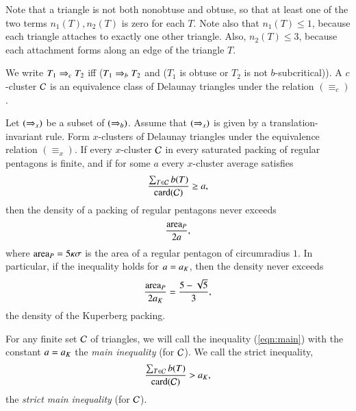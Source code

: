 \begin{remark}
  Note that a triangle is not both nonobtuse and obtuse, so that at
  least one of the two terms $n_1(T), n_2(T)$ is zero for each $T$.
  Note also that $n_1(T)\le 1$, because each triangle attaches to
  exactly one other triangle.  Also, $n_2(T)\le 3$, because each
  attachment forms along an edge of the triangle $T$.
\end{remark}

We write $T_1\Rightarrow_{c} T_2$ iff ($T_1 \Rightarrow_{b} T_2$ and ($T_1$ is obtuse or
$T_2$ is not $b$-subcritical)).  A $c$-cluster $\mathcal C$ is an equivalence
class of Delaunay triangles under the relation $(\equiv_c)$.


\begin{lemma}\label{lemma:main}  
  Let $(\Rightarrow_{x})$ be a subset of $(\Rightarrow_{b})$.  Assume that $(\Rightarrow_{x})$ is
  given by a translation-invariant rule.  Form $x$-clusters of
  Delaunay triangles under the equivalence relation $(\equiv_x)$. If
  every $x$-cluster $\mathcal C$ in every saturated packing of regular
  pentagons is finite, and if for some $a$ every $x$-cluster average
  satisfies
\begin{equation}\label{eqn:main}
\frac{\sum_{T\in \mathcal C} b(T)}{{\operatorname{card}}(\mathcal C)} \ge a,
\end{equation}
then the density of a packing of regular pentagons never exceeds 
\[
\frac{{\operatorname{area}}_P} {2 a},
\]
where ${\operatorname{area}}_P = 5\kappa\sigma$ is the area of a regular pentagon of
circumradius $1$.  In particular, if the inequality holds for $a=a_K$,
then the density never exceeds
\[
\frac{{\operatorname{area}}_P}{2 a_K} = \frac{5 - \sqrt{5}}{3},
\] %
the density of the Kuperberg packing.
\end{lemma}

For any finite set $\mathcal C$ of triangles, we will call the inequality
(\ref{eqn:main}) with the constant $a=a_K$ the {\it main inequality}
(for $\mathcal C$).  We call the strict inequality,
\begin{equation}\label{eqn:strict-main}
\frac{\sum_{T\in \mathcal C} b(T)}{{\operatorname{card}}(\mathcal C)} > a_K,
\end{equation}
the {\it strict main inequality} (for $\mathcal C$).


